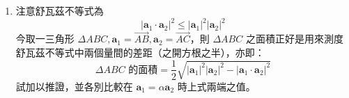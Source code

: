 \begin{enumerate}[label=\arabic*., leftmargin=2em]
  \item 注意舒瓦茲不等式為
  \[ |\mathbf{a}_1\cdot\mathbf{a}_2|^2 \le |\mathbf{a}_1|^2|\mathbf{a}_2|^2 \]
  今取一三角形 $\Delta ABC, \mathbf{a}_1 = \vec{AB}, \mathbf{a}_2 = \vec{AC}$，則 $\Delta ABC$ 之面積正好是用來測度舒瓦茲不等式中兩個量間的差距（之開方根之半），亦即：
  \[ \Delta ABC \text{ 的面積} = \frac{1}{2}\sqrt{|\mathbf{a}_1|^2|\mathbf{a}_2|^2 - |\mathbf{a}_1\cdot\mathbf{a}_2|^2} \]
  試加以推證，並各別比較在 $\mathbf{a}_1 = \alpha\mathbf{a}_2$ 時上式兩端之值。
\end{enumerate}
